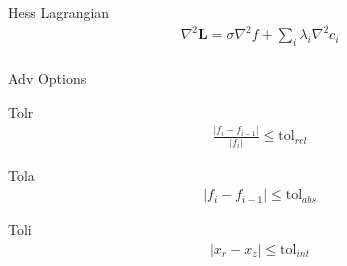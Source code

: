 \documentclass{article}
\begin{document}
Hess Lagrangian
\begin{align*}
    \nabla^2 \mathbf{L} = \sigma \nabla^2 f + \sum_i \lambda_i \nabla^2 c_i\\
\end{align*}

Adv Options

Tolr
\begin{align*}
    \frac{\left| f_i - f_{i-1} \right|}{\left| f_i \right|}  \le \text{tol}_{rel}
\end{align*}

Tola
\begin{align*}
    \left| f_i - f_{i-1}\right| \le \text{tol}_{abs}
\end{align*}

Toli
\begin{align*}
    \left| x_r - x_z \right| \le \text{tol}_{int}
\end{align*}
\end{document}
